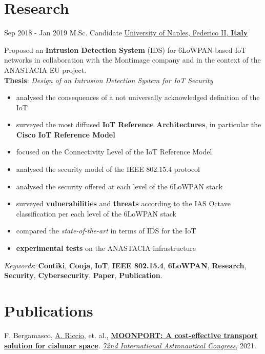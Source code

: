 \documentclass[letterpaper]{twentysecondcv} %
\begin{document}
\section{Research}
\begin{twenty}
	\twentyitem
    	{Sep 2018 -}
		{Jan 2019}
        {M.Sc. Candidate}
        {\href{http://www.scuolapsb.unina.it/}{University of Naples, Federico II, \textbf{Italy}}}
        {}
        {
           Proposed an \textbf{Intrusion Detection System} (IDS) for 6LoWPAN-based IoT networks in collaboration with the Montimage company and in the context of the ANASTACIA EU project.\\
            \textbf{Thesis}: \textit{Design of an Intrusion Detection System for IoT Security}
            {
                \begin{itemize}
                    \item analysed the consequences of a not universally acknowledged definition of the IoT
                    \item surveyed the most diffused \textbf{IoT Reference Architectures}, in particular the \textbf{Cisco IoT Reference Model}
                    \item focused on the Connectivity Level of the IoT Reference Model
                    \item analysed the security model of the IEEE 802.15.4 protocol
                    \item analysed the security offered at each level of the 6LoWPAN stack
                    \item surveyed \textbf{vulnerabilities} and \textbf{threats} according to the IAS Octave classification per each level of the 6LoWPAN stack
                    \item compared the \textit{state-of-the-art} in terms of IDS for the IoT
                    \item \textbf{experimental tests} on the ANASTACIA infrastructure
                \end{itemize}
            }
            \textit{Keywords}: \textbf{Contiki}, \textbf{Cooja}, \textbf{IoT}, \textbf{IEEE 802.15.4}, \textbf{6LoWPAN}, \textbf{Research}, \textbf{Security}, \textbf{Cybersecurity}, \textbf{Paper}, \textbf{Publication}.
        }
\end{twenty}
%
%
\section{Publications}
 F. Bergamasco, \href{https://scholar.google.com/citations?user=A3XqqTEAAAAJ&hl=it}{A. Riccio}, et. al.,
 \href{https://www.researchgate.net/publication/355856343_MOONPORT_A_cost-effective_transport_solution_for_cislunar_space}
 {\textbf{MOONPORT: A cost-effective transport solution for cislunar space}}.
 \href{https://iafastro.directory/iac/paper/id/63931/summary/}
 {\textit{72nd International Astronautical Congress}}, 2021.
\end{document}
